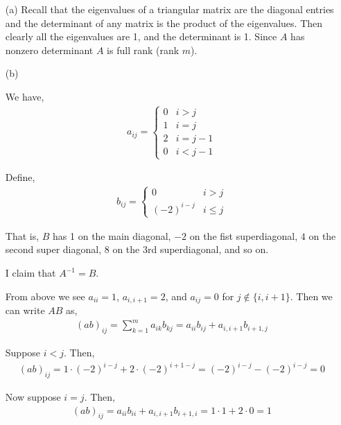\documentclass[10pt]{article}
\begin{document}
\begin{solution}[Solution]
\begin{enumerate}
    \item[(a)] Recall that the eigenvalues of a triangular matrix are the diagonal entries and the determinant of any matrix is the product of the eigenvalues.
        Then clearly all the eigenvalues are 1, and the determinant is 1. Since \( A \) has nonzero determinant \( A \) is full rank (rank \( m \)).
    \item[(b)] 
        
        We have,
        \begin{align*}
            a_{ij} = 
            \begin{cases}
                0 & i>j \\
                1 & i=j \\
                2 & i=j-1 \\
                0 & i<j-1
            \end{cases}
        \end{align*}
        
        Define,
        \begin{align*}
            b_{ij} =
            \begin{cases}
                0 & i>j \\
                (-2)^{i-j} & i\leq j
            \end{cases}
        \end{align*}
          
        That is, \( B \) has 1 on the main diagonal, \( -2 \) on the fist superdiagonal, \( 4 \) on the second super diagonal, \( 8 \) on the 3rd superdiagonal, and so on. 

        I claim that \( A^{-1}=B \). 

        From above we see \( a_{ii}=1 \), \( a_{i,i+1}=2 \), and \( a_{ij}=0 \) for \( j\notin\{i,i+1\} \). Then we can write \( AB \) as,
        \begin{align*}
            (ab)_{ij} = \sum_{k=1}^{m}a_{ik}b_{kj} = a_{ii}b_{ij}+a_{i,i+1}b_{i+1,j}
        \end{align*}

        Suppose \( i<j \). Then,
        \begin{align*}
            (ab)_{ij} = 1\cdot(-2)^{i-j}+2\cdot (-2)^{i+1-j} = (-2)^{i-j}-(-2)^{i-j} = 0
        \end{align*}
        
        Now suppose \( i=j \). Then,
        \begin{align*}
            (ab)_{ij} = a_{ii}b_{ii}+a_{i,i+1}b_{i+1,i} = 1\cdot 1+2\cdot 0 = 1
        \end{align*}


\end{enumerate}
\end{solution}
\end{document}
